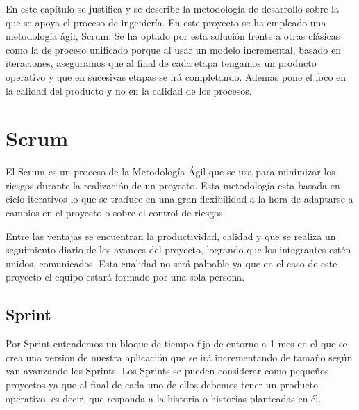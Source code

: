 En este capítulo se justifica y se describe la metodología de desarrollo sobre la que se apoya el proceso de ingeniería. En este proyecto se ha empleado una metodología ágil, Scrum. Se ha optado por esta solución frente a otras clásicas como la de proceso unificado porque al usar un modelo incremental, basado en iteraciones, aseguramos que al final de cada etapa tengamos un producto operativo y que en sucesivas etapas se irá completando. Ademas pone el foco en la calidad del producto y no en la calidad de los procesos.



\section{Scrum}

El Scrum es un proceso de la Metodología Ágil que se usa para minimizar los riesgos durante la realización de un proyecto. 
Esta metodología esta basada en ciclo iterativos lo que se traduce en una gran flexibilidad a la hora de adaptarse a cambios en el proyecto o sobre el control de riesgos. 



Entre las ventajas se encuentran la productividad, calidad y que se realiza un seguimiento diario de los avances del proyecto, logrando que los integrantes estén unidos, comunicados. Esta cualidad no será palpable ya que en el caso de este proyecto el equipo estará formado por una sola persona.\\

\subsection{Sprint}

Por Sprint entendemos un bloque de tiempo fijo de entorno a 1 mes en el que
se crea una version de nuestra aplicación que se irá incrementando de tamaño
según van avanzando los Sprints. Los Sprints se pueden considerar como pequeños
proyectos ya que al final de cada uno de ellos debemos tener un producto
operativo, es decir, que responda a la historia o historias planteadas en él.



